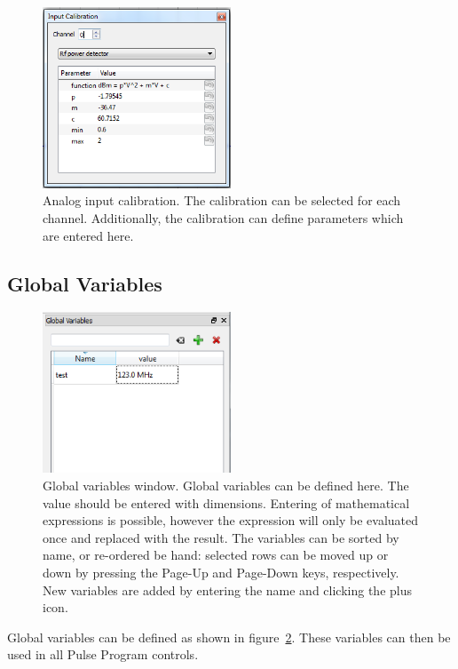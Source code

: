 \documentclass[11pt]{scrartcl}
\begin{document}
\begin{figure}
\centering
\includegraphics[width=0.5\textwidth]{AnalogInputCalibration}
\caption{\label{AnalogInputCalibration} Analog input calibration. The calibration can be selected for each channel. Additionally, the calibration can define parameters which are entered here.}
\end{figure}

\subsection{Global Variables}
\begin{figure}
\centering
\includegraphics[width=0.5\textwidth]{GlobalVariables}
\caption{\label{GlobalVariables} Global variables window. Global variables can be defined here. The value should be entered with dimensions. Entering of mathematical expressions is possible, however the expression will only be evaluated once and replaced with the result. The variables can be sorted by name, or re-ordered be hand: selected rows can be moved up or down by pressing the Page-Up and Page-Down keys, respectively. New variables are added by entering the name and clicking the plus icon.}
\end{figure}

Global variables can be defined as shown in figure~\ref{GlobalVariables}. These variables can then be used in all Pulse Program controls.
\end{document}
